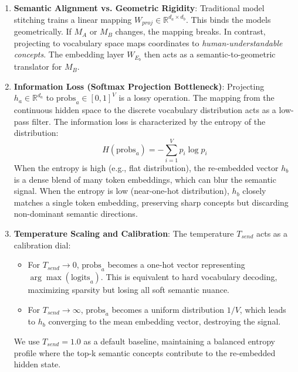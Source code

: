 \documentclass{article}
\begin{document}
\begin{enumerate}
	\item \textbf{Semantic Alignment vs. Geometric Rigidity}: Traditional model stitching trains a linear mapping $W_{proj} \in \mathbb{R}^{d_a \times d_b}$. This binds the models geometrically. If $M_A$ or $M_B$ changes, the mapping breaks. In contrast, projecting to vocabulary space maps coordinates to \textit{human-understandable concepts}. The embedding layer $W_{E_b}$ then acts as a semantic-to-geometric translator for $M_B$.
	\item \textbf{Information Loss (Softmax Projection Bottleneck)}: Projecting $h_a \in \mathbb{R}^{d_a}$ to $\text{probs}_a \in [0,1]^V$ is a lossy operation. The mapping from the continuous hidden space to the discrete vocabulary distribution acts as a low-pass filter. The information loss is characterized by the entropy of the distribution:
	\begin{equation}
	H(\text{probs}_a) = - \sum_{i=1}^{V} p_i \log p_i
	\end{equation}
	When the entropy is high (e.g., flat distribution), the re-embedded vector $h_b$ is a dense blend of many token embeddings, which can blur the semantic signal. When the entropy is low (near-one-hot distribution), $h_b$ closely matches a single token embedding, preserving sharp concepts but discarding non-dominant semantic directions.
	\item \textbf{Temperature Scaling and Calibration}: The temperature $T_{send}$ acts as a calibration dial:
	\begin{itemize}
		\item For $T_{send} \to 0$, $\text{probs}_a$ becomes a one-hot vector representing $\arg\max(\text{logits}_a)$. This is equivalent to hard vocabulary decoding, maximizing sparsity but losing all soft semantic nuance.
		\item For $T_{send} \to \infty$, $\text{probs}_a$ becomes a uniform distribution $1/V$, which leads to $h_b$ converging to the mean embedding vector, destroying the signal.
	\end{itemize}
	We use $T_{send} = 1.0$ as a default baseline, maintaining a balanced entropy profile where the top-k semantic concepts contribute to the re-embedded hidden state.
\end{enumerate}
\end{document}
